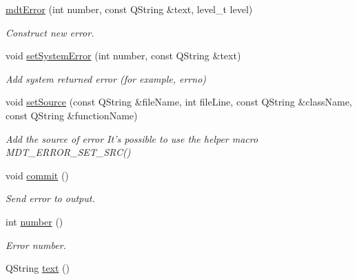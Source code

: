 \begin{DoxyCompactItemize}
\item 
\hypertarget{classmdt_error_a377c175cc8e1aeae543cae2ecc5ca87b}{
\hyperlink{classmdt_error_a377c175cc8e1aeae543cae2ecc5ca87b}{mdtError} (int number, const QString \&text, level\_\-t level)}
\label{classmdt_error_a377c175cc8e1aeae543cae2ecc5ca87b}

\begin{DoxyCompactList}\small\item\em Construct new error. \end{DoxyCompactList}\item 
\hypertarget{classmdt_error_a49254fdb566fee1a4adafe6a3694befc}{
void \hyperlink{classmdt_error_a49254fdb566fee1a4adafe6a3694befc}{setSystemError} (int number, const QString \&text)}
\label{classmdt_error_a49254fdb566fee1a4adafe6a3694befc}

\begin{DoxyCompactList}\small\item\em Add system returned error (for example, errno) \end{DoxyCompactList}\item 
\hypertarget{classmdt_error_a0df51beab0ddaba26d5194690303d682}{
void \hyperlink{classmdt_error_a0df51beab0ddaba26d5194690303d682}{setSource} (const QString \&fileName, int fileLine, const QString \&className, const QString \&functionName)}
\label{classmdt_error_a0df51beab0ddaba26d5194690303d682}

\begin{DoxyCompactList}\small\item\em Add the source of error It's possible to use the helper macro MDT\_\-ERROR\_\-SET\_\-SRC() \end{DoxyCompactList}\item 
\hypertarget{classmdt_error_ad3cccf7c7f7d4bdabdcb4e60794bb9cb}{
void \hyperlink{classmdt_error_ad3cccf7c7f7d4bdabdcb4e60794bb9cb}{commit} ()}
\label{classmdt_error_ad3cccf7c7f7d4bdabdcb4e60794bb9cb}

\begin{DoxyCompactList}\small\item\em Send error to output. \end{DoxyCompactList}\item 
\hypertarget{classmdt_error_ae1a118da6923baaf386c7ab5f08b3549}{
int \hyperlink{classmdt_error_ae1a118da6923baaf386c7ab5f08b3549}{number} ()}
\label{classmdt_error_ae1a118da6923baaf386c7ab5f08b3549}

\begin{DoxyCompactList}\small\item\em Error number. \end{DoxyCompactList}\item 
\hypertarget{classmdt_error_a3d1bbc08e84ef25d45054b8d440989e6}{
QString \hyperlink{classmdt_error_a3d1bbc08e84ef25d45054b8d440989e6}{text} ()}
\label{classmdt_error_a3d1bbc08e84ef25d45054b8d440989e6}


\end{DoxyCompactItemize}
